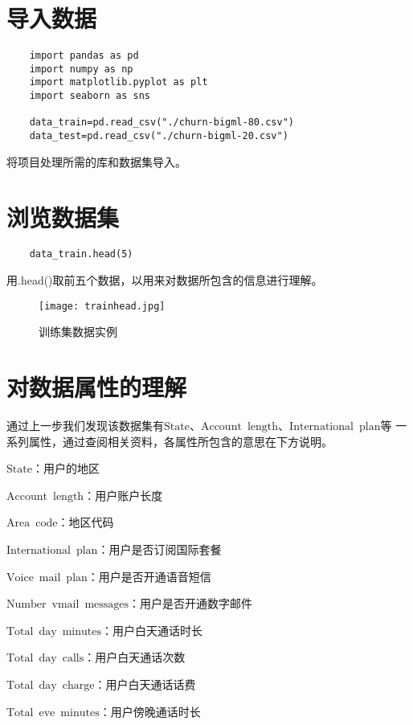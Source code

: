 \documentclass[AutoFakeBold]{LZUThesis}
\begin{document}
\section{导入数据}

\begin{lstlisting}
    import pandas as pd
    import numpy as np
    import matplotlib.pyplot as plt
    import seaborn as sns 
    
    data_train=pd.read_csv("./churn-bigml-80.csv")
    data_test=pd.read_csv("./churn-bigml-20.csv")
\end{lstlisting}
将项目处理所需的库和数据集导入。

\section{浏览数据集}

\begin{lstlisting}
    data_train.head(5)
\end{lstlisting}
用.head()取前五个数据，以用来对数据所包含的信息进行理解。
\begin{figure}[htbp]
    \centering
    \texttt{[image: trainhead.jpg]}
    \caption{训练集数据实例}
\end{figure}
\section{对数据属性的理解}
通过上一步我们发现该数据集有$\mathrm{State}$、$\mathrm{Account \enspace length}$、$\mathrm{International\enspace plan}$等
一系列属性，通过查阅相关资料，各属性所包含的意思在下方说明。

$\mathrm{State}$：用户的地区

$\mathrm{Account \enspace length}$：用户账户长度

$\mathrm{Area \enspace code}$：地区代码

$\mathrm{International\enspace plan}$：用户是否订阅国际套餐

$\mathrm{Voice\enspace mail\enspace  plan}$：用户是否开通语音短信

$\mathrm{Number\enspace vmail\enspace messages}$：用户是否开通数字邮件

$\mathrm{Total\enspace day\enspace minutes}$：用户白天通话时长

$\mathrm{Total\enspace day\enspace calls}$：用户白天通话次数

$\mathrm{Total\enspace day\enspace charge}$：用户白天通话话费

$\mathrm{Total\enspace eve\enspace minutes}$：用户傍晚通话时长
\end{document}
